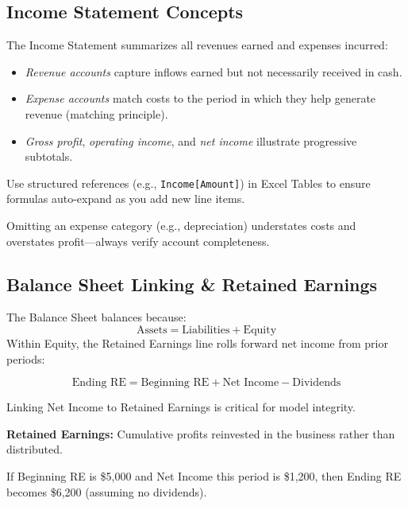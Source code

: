 \subsection{Income Statement Concepts}
The Income Statement summarizes all revenues earned and expenses incurred:

\begin{itemize}
  \item \emph{Revenue accounts} capture inflows earned but not necessarily received in cash.
  \item \emph{Expense accounts} match costs to the period in which they help generate revenue (matching principle).
  \item \emph{Gross profit}, \emph{operating income}, and \emph{net income} illustrate progressive subtotals.
\end{itemize}

\begin{Tip}
Use structured references (e.g., \verb|Income[Amount]|) in Excel Tables to ensure formulas auto-expand as you add new line items.
\end{Tip}

\begin{Warning}
Omitting an expense category (e.g., depreciation) understates costs and overstates profit—always verify account completeness.
\end{Warning}

\subsection{Balance Sheet Linking \& Retained Earnings}
The Balance Sheet balances because:
\[
  \text{Assets} = \text{Liabilities} + \text{Equity}
\]
Within Equity, the Retained Earnings line rolls forward net income from prior periods:

\[
  \text{Ending RE} = \text{Beginning RE} + \text{Net Income} - \text{Dividends}
\]

Linking Net Income to Retained Earnings is critical for model integrity.

\begin{Definition}
\textbf{Retained Earnings:} Cumulative profits reinvested in the business rather than distributed.
\end{Definition}

\begin{Example}
If Beginning RE is \$5,000 and Net Income this period is \$1,200, then Ending RE becomes \$6,200 (assuming no dividends).
\end{Example}

